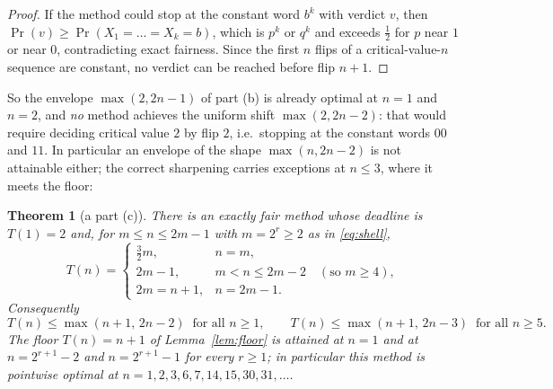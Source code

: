 \documentclass[11pt]{article}
\newtheorem{theorem}{Theorem}
\theoremstyle{remark}
\begin{document}
\begin{proof}
If the method could stop at the constant word $b^k$ with verdict $v$, then
$\Pr(v)\ge \Pr(X_1=\dots=X_k=b)$, which is $p^k$ or $q^k$ and exceeds
$\tfrac12$ for $p$ near $1$ or near $0$, contradicting exact fairness. Since
the first $n$ flips of a critical-value-$n$ sequence are constant, no verdict
can be reached before flip $n+1$.
\end{proof}

So the envelope $\max(2,2n-1)$ of part (b) is already optimal at $n=1$ and
$n=2$, and \emph{no} method achieves the uniform shift $\max(2,2n-2)$: that
would require deciding critical value $2$ by flip $2$, i.e.\ stopping at the
constant words $00$ and $11$. In particular an envelope of the shape
$\max(n,2n-2)$ is not attainable either; the correct sharpening carries
exceptions at $n\le 3$, where it meets the floor:

\begin{theorem}[a part (c)]\label{thm:c}
There is an exactly fair method whose deadline is $T(1)=2$ and, for
$m\le n\le 2m-1$ with $m=2^{r}\ge 2$ as in \eqref{eq:shell},
\begin{equation}\label{eq:cdeadline}
T(n)=
\begin{cases}
\tfrac32 m, & n=m,\\[2pt]
2m-1, & m<n\le 2m-2 \quad (\text{so } m\ge4),\\[2pt]
2m=n+1, & n=2m-1 .
\end{cases}
\end{equation}
Consequently
\[
T(n)\le\max(n+1,\,2n-2)\ \text{ for all } n\ge1,
\qquad
T(n)\le\max(n+1,\,2n-3)\ \text{ for all } n\ge5 .
\]
The floor $T(n)=n+1$ of Lemma~\ref{lem:floor} is attained at $n=1$ and at
$n=2^{r+1}-2$ and $n=2^{r+1}-1$ for every $r\ge1$; in particular this method
is pointwise optimal at $n=1,2,3,6,7,14,15,30,31,\dots$.
\end{theorem}
\end{document}
